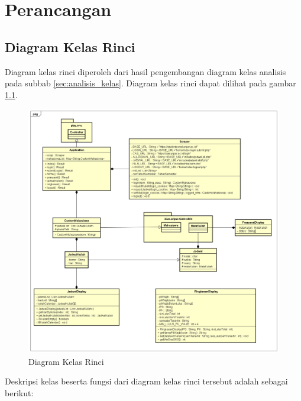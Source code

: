 \chapter{Perancangan}
\label{chap:perancangan}

\section{Diagram Kelas Rinci} 
\label{sec:diagram_kelas_rinci}
Diagram kelas rinci diperoleh dari hasil pengembangan diagram kelas analisis pada subbab \ref{sec:analisis_kelas}. Diagram kelas rinci dapat dilihat pada gambar \ref{fig:4_final_class_diagram}. 
	\begin{figure}[H]
			\centering
			\includegraphics[scale=0.45]{Gambar/class-diagram-final}
			\caption{Diagram Kelas Rinci} 
			\label{fig:4_final_class_diagram}
		\end{figure}
	Deskripsi kelas beserta fungsi dari diagram kelas rinci tersebut adalah sebagai berikut:

